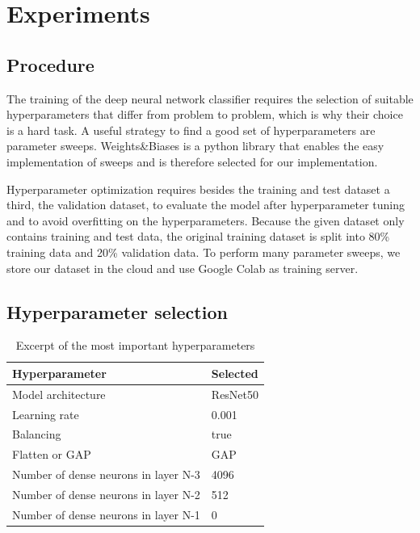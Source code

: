 \documentclass{article}
\begin{document}
\section{Experiments}
\subsection{Procedure}
The training of the deep neural network classifier requires the selection of suitable hyperparameters that differ from
problem to problem, which is why their choice is a hard task. A useful strategy to find a good set of hyperparameters are parameter 
sweeps. Weights\&Biases is a python library that enables the easy implementation of sweeps and is therefore selected for our implementation. 

Hyperparameter optimization requires besides the training and test dataset a third, the validation dataset, to evaluate the
model after hyperparameter tuning and to avoid overfitting on the hyperparameters. Because the given dataset only contains 
training and test data, the original training dataset is split into 80\% training data and 20\% validation data.
To perform many parameter sweeps, we store our dataset in the cloud and use Google Colab as training server. 

\subsection{Hyperparameter selection}\label{ch_hyperparam}


\renewcommand{\arraystretch}{1.2}
\begin{table}
  \vspace{-20pt}
  \begin{tabular}{|l|l|}
  \hline
  Hyperparameter & Selected\\ \hline \hline
  Model architecture & ResNet50 \\ \hline
  Learning rate & 0.001 \\ \hline
  Balancing & true \\ \hline
  Flatten or GAP & GAP \\ \hline
  Number of dense neurons in layer N-3 & 4096 \\ \hline
  Number of dense neurons in layer N-2 & 512 \\ \hline
  Number of dense neurons in layer N-1 & 0 \\ \hline
  \end{tabular}
  \caption{Excerpt of the most important hyperparameters} \label{tab:hyperparam}
  \end{table}
\end{document}
